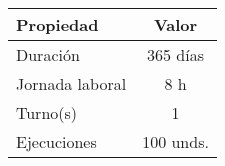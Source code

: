 \documentclass[varwidth=\maxdimen]{standalone}
\begin{document}
\begin{tabular}{ l c }
	\toprule
	Propiedad	& Valor  \\
	\midrule
	Duración		& 365 días \\
	Jornada laboral	& 8 h \\
	Turno(s)		& 1 \\
	Ejecuciones		& 100 unds. \\
	\bottomrule
\end{tabular}
\end{document}
